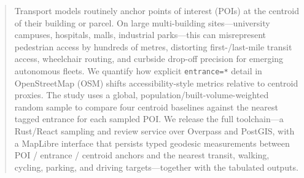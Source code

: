 \begin{abstract}
    Transport models routinely anchor points of interest (POIs) at
    the centroid of their building or parcel. On large multi-building
    sites---university campuses, hospitals, malls, industrial
    parks---this can misrepresent pedestrian access by hundreds of
    metres, distorting first-/last-mile transit access, wheelchair
    routing, and curbside drop-off precision for emerging autonomous
    fleets. We quantify how explicit \texttt{entrance=*} detail in
    OpenStreetMap (OSM) shifts accessibility-style metrics relative
    to centroid proxies. The study uses a global,
    population/built-volume-weighted random sample to compare four
    centroid baselines against the nearest tagged entrance for each
    sampled POI. We release
    the full toolchain---a Rust/React sampling and review service
    over Overpass and PostGIS, with a MapLibre interface that
    persists typed geodesic measurements between POI / entrance /
    centroid anchors and the nearest transit, walking, cycling,
    parking, and driving targets---together with the tabulated
    outputs.
\end{abstract}